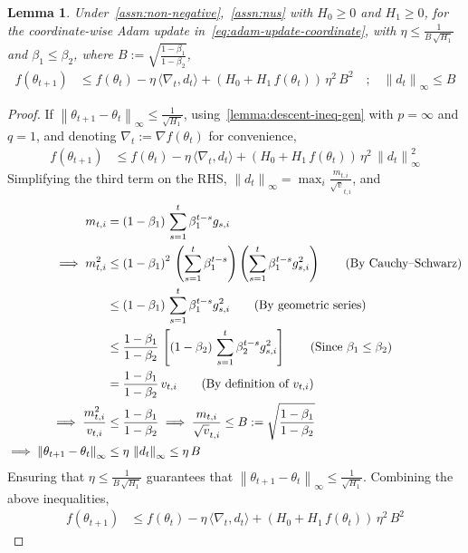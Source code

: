 \documentclass{article}
\newtheorem{lemma}{Lemma}
\newcommand{\ti}[1]{#1_{t,i}}
\newcommand{\si}[1]{#1_{s,i}}
\newcommand{\normsq}[1]{\left\|#1 \right\|^{2}}
\newcommand{\norm}[1]{\left\|#1 \right\|}
\newcommand{\tht}{\theta_t}
\newcommand{\thtt}{\theta_{t+1}}
\begin{document}
\begin{lemma}
Under~\cref{assn:non-negative},~\cref{assn:nus} with $H_0 \geq 0$ and $H_1 \geq 0$, for the coordinate-wise Adam update in~\cref{eq:adam-update-coordinate}, with $\eta \leq \frac{1}{B \, \sqrt{H_1}}$ and $\beta_1 \leq \beta_2$, where $B := \sqrt{\frac{1 - \beta_1}{1 - \beta_2}}$, 
\begin{align*}
f(\thtt) & \leq f(\tht) - \eta \, \langle \nabla_t, d_t \rangle +  \left(H_0 + H_1 \, f(\tht) \right) \, \eta^2 \, B^2 \quad \text{;} \quad \norm{d_t}_\infty \leq B
\end{align*}   
\label{lemma:adam-descent}
\end{lemma}
\begin{proof}
If $\norm{\thtt - \tht}_\infty \leq \frac{1}{\sqrt{H_1}}$, using~\cref{lemma:descent-ineq-gen} with $p = \infty$ and $q = 1$, and denoting $\nabla_t := \nabla f(\tht)$ for convenience,
\begin{align*}
f(\thtt) & \leq f(\tht) - \eta \, \langle \nabla_t, d_t \rangle + \left(H_0 + H_1 \, f(\tht) \right) \, \eta^2  \, \normsq{d_t}_\infty
\end{align*}
Simplifying the third term on the RHS, $\norm{d_t}_\infty = \max_{i} \frac{\ti{m}}{\ti{\sqrt{v}}}$, and
\begin{align*}
\ti{m} & = (1-\beta_1) \, \sum_{s = 1}^{t} \beta_1^{t-s} \si{g} \\
\implies \ti{m^2} & \leq \left(1-\beta_1\right)^2 \, \left(\sum_{s = 1}^{t} \beta_1^{t-s}\right) \left(\sum_{s = 1}^{t} \beta_1^{t-s} \si{g^2} \right) \tag{By Cauchy--Schwarz} \\
& \leq \left(1-\beta_1\right) \, \sum_{s = 1}^{t} \beta_1^{t-s} \si{g^2} \tag{By geometric series} \\
& \leq \frac{1 - \beta_1}{1 - \beta_2} \, \left[\left(1-\beta_2\right) \, \sum_{s = 1}^{t} \beta_2^{t-s} \si{g^2} \right] \tag{Since $\beta_1 \leq \beta_2$} \\
&= \frac{1 - \beta_1}{1 - \beta_2} \, \ti{v} \tag{By definition of $\ti{v}$} \\
\implies \frac{\ti{m^2}}{\ti{v}} & \leq \frac{1 - \beta_1}{1 - \beta_2}  \implies  \frac{\ti{m}}{\ti{\sqrt{v}}} \leq B := \sqrt{\frac{1 - \beta_1}{1 - \beta_2} } \\
\implies \norm{\thtt - \tht}_\infty & \leq \eta \, \norm{d_t}_\infty \leq \eta \, B \label{eq:adam-1pl-thirdterm}
\end{align*} 
Ensuring that $\eta \leq \frac{1}{B \, \sqrt{H_1}}$ guarantees that $\norm{\thtt - \tht}_\infty \leq \frac{1}{\sqrt{H_1}}$. Combining the above inequalities, 
\begin{align}
f(\thtt) & \leq f(\tht) - \eta \, \langle \nabla_t, d_t \rangle +  \left(H_0 + H_1 \, f(\tht) \right) \, \eta^2 \, B^2 
\end{align}    
\end{proof}
\end{document}
